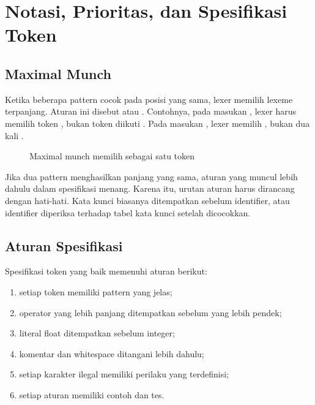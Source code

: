 \section{Notasi, Prioritas, dan Spesifikasi Token}
\label{sec:ch05-notasi}

\subsection{Maximal Munch}

Ketika beberapa pattern cocok pada posisi yang sama, lexer memilih
lexeme terpanjang. Aturan ini disebut  atau
. Contohnya, pada masukan \code{<=}, lexer harus
memilih token , bukan token  diikuti
. Pada masukan \code{==}, lexer memilih ,
bukan dua kali .

\begin{figure}[H]
\centering
{}
\caption{Maximal munch memilih \code{<=} sebagai satu token}
\label{fig:ch05-munch}
\end{figure}

Jika dua pattern menghasilkan panjang yang sama, aturan yang muncul
lebih dahulu dalam spesifikasi menang. Karena itu, urutan aturan
harus dirancang dengan hati-hati. Kata kunci biasanya ditempatkan
sebelum identifier, atau identifier diperiksa terhadap tabel kata
kunci setelah dicocokkan.

\subsection{Aturan Spesifikasi}

Spesifikasi token yang baik memenuhi aturan berikut:
\begin{enumerate}[label=\arabic*.,leftmargin=*]
  \item setiap token memiliki pattern yang jelas;
  \item operator yang lebih panjang ditempatkan sebelum yang lebih
        pendek;
  \item literal float ditempatkan sebelum integer;
  \item komentar dan whitespace ditangani lebih dahulu;
  \item setiap karakter ilegal memiliki perilaku yang terdefinisi;
  \item setiap aturan memiliki contoh dan tes.
\end{enumerate}


